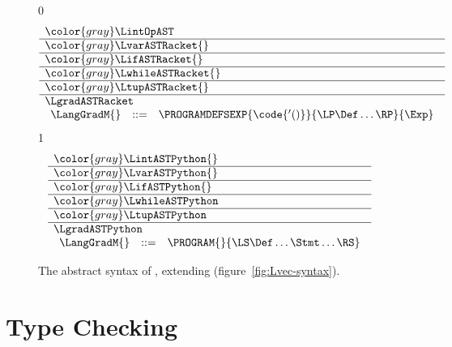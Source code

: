\documentclass[7x10]{TimesAPriori_MIT}%
\newcommand{\gray}[1]{{\color{gray} #1}}
\def\racketEd{0}
\def\pythonEd{1}
\providecommand{\BookEdition}{1}
\let\edition\BookEdition
\newcommand{\pythonColor}[0]{}
\numberwithin{theorem}{chapter}
\numberwithin{definition}{chapter}
\numberwithin{equation}{chapter}
\begin{document}
\begin{figure}[tbp]
\centering
\begin{tcolorbox}[colback=white]
    \small
{\if\edition\racketEd
\[
\begin{array}{l}
  \gray{\LintOpAST} \\ \hline
  \gray{\LvarASTRacket{}} \\ \hline
  \gray{\LifASTRacket{}} \\ \hline
  \gray{\LwhileASTRacket{}} \\ \hline
  \gray{\LtupASTRacket{}} \\ \hline
  \LgradASTRacket \\
\begin{array}{lcl}
  \LangGradM{} &::=& \PROGRAMDEFSEXP{\code{'()}}{\LP\Def\ldots\RP}{\Exp}
\end{array}
\end{array}
\]
\fi}
{\if\edition\pythonEd\pythonColor
\[
\begin{array}{l}
  \gray{\LintASTPython{}} \\ \hline
  \gray{\LvarASTPython{}} \\ \hline
  \gray{\LifASTPython{}} \\ \hline
  \gray{\LwhileASTPython} \\ \hline
  \gray{\LtupASTPython} \\   \hline
  \LgradASTPython \\
  \begin{array}{lcl}
    \LangGradM{} &::=& \PROGRAM{}{\LS \Def \ldots \Stmt \ldots \RS}
  \end{array}
\end{array}
\]
\fi}
\end{tcolorbox}

\caption{The abstract syntax of \LangGrad{}, extending \LangVec{} (figure~\ref{fig:Lvec-syntax}).}
\label{fig:Lgrad-syntax}
\end{figure}




\section{Type Checking \LangGrad{}}
\label{sec:gradual-type-check}
\end{document}
